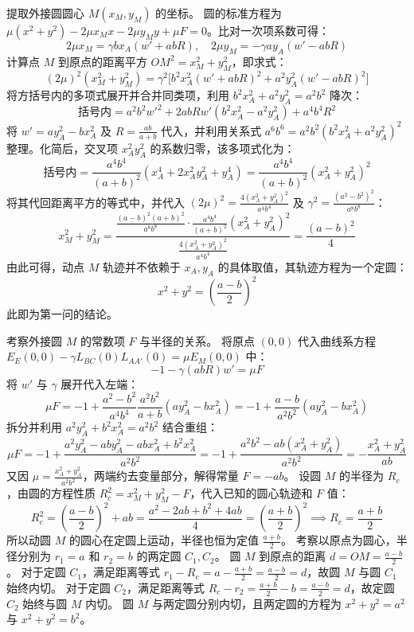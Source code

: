\begin{solution}
提取外接圆圆心 $M(x_M, y_M)$ 的坐标。
圆的标准方程为 $\mu(x^2 + y^2) - 2\mu x_M x - 2\mu y_M y + \mu F = 0$。比对一次项系数可得：
$$ 2\mu x_M = \gamma b x_A (w' + ab R), \quad 2\mu y_M = -\gamma a y_A (w' - ab R) $$
计算点 $M$ 到原点的距离平方 $OM^2 = x_M^2 + y_M^2$，即求式：
$$ (2\mu)^2 (x_M^2 + y_M^2) = \gamma^2 \big[ b^2 x_A^2 (w' + ab R)^2 + a^2 y_A^2 (w' - ab R)^2 \big] $$
将方括号内的多项式展开并合并同类项，利用 $b^2 x_A^2 + a^2 y_A^2 = a^2 b^2$ 降次：
$$ \text{括号内} = a^2 b^2 w'^2 + 2 ab R w' (b^2 x_A^2 - a^2 y_A^2) + a^4 b^4 R^2 $$
将 $w' = a y_A^2 - b x_A^2$ 及 $R = \frac{ab}{a+b}$ 代入，并利用关系式 $a^6 b^6 = a^2 b^2 (b^2 x_A^2 + a^2 y_A^2)^2$ 整理。化简后，交叉项 $x_A^2 y_A^2$ 的系数归零，该多项式化为：
$$ \text{括号内} = \frac{a^4 b^4}{(a+b)^2} (x_A^4 + 2x_A^2 y_A^2 + y_A^4) = \frac{a^4 b^4}{(a+b)^2} (x_A^2 + y_A^2)^2 $$
将其代回距离平方的等式中，并代入 $(2\mu)^2 = \frac{4(x_A^2 + y_A^2)^2}{a^4 b^4}$ 及 $\gamma^2 = \frac{(a^2-b^2)^2}{a^8 b^8}$：
$$ x_M^2 + y_M^2 = \frac{ \frac{(a-b)^2 (a+b)^2}{a^8 b^8} \cdot \frac{a^4 b^4}{(a+b)^2} (x_A^2 + y_A^2)^2 }{ \frac{4(x_A^2 + y_A^2)^2}{a^4 b^4} } = \frac{(a-b)^2}{4} $$
由此可得，动点 $M$ 轨迹并不依赖于 $x_A, y_A$ 的具体取值，其轨迹方程为一个定圆：
$$ x^2 + y^2 = \left( \frac{a-b}{2} \right)^2 $$
此即为第一问的结论。

考察外接圆 $M$ 的常数项 $F$ 与半径的关系。
将原点 $(0,0)$ 代入曲线系方程 $E_E(0,0) - \gamma L_{BC}(0) L_{AA'}(0) = \mu E_M(0,0)$ 中：
$$ -1 - \gamma (ab R) w' = \mu F $$
将 $w'$ 与 $\gamma$ 展开代入左端：
$$ \mu F = -1 + \frac{a^2-b^2}{a^4 b^4} \frac{a^2 b^2}{a+b} (a y_A^2 - b x_A^2) = -1 + \frac{a-b}{a^2 b^2} (a y_A^2 - b x_A^2) $$
拆分并利用 $a^2 y_A^2 + b^2 x_A^2 = a^2 b^2$ 结合重组：
$$ \mu F = -1 + \frac{a^2 y_A^2 - ab y_A^2 - ab x_A^2 + b^2 x_A^2}{a^2 b^2} = -1 + \frac{a^2 b^2 - ab(x_A^2 + y_A^2)}{a^2 b^2} = - \frac{x_A^2 + y_A^2}{ab} $$
又因 $\mu = \frac{x_A^2 + y_A^2}{a^2 b^2}$，两端约去变量部分，解得常量 $F = -ab$。
设圆 $M$ 的半径为 $R_c$，由圆的方程性质 $R_c^2 = x_M^2 + y_M^2 - F$，代入已知的圆心轨迹和 $F$ 值：
$$ R_c^2 = \left( \frac{a-b}{2} \right)^2 + ab = \frac{a^2 - 2ab + b^2 + 4ab}{4} = \left( \frac{a+b}{2} \right)^2 \implies R_c = \frac{a+b}{2} $$
所以动圆 $M$ 的圆心在定圆上运动，半径也恒为定值 $\frac{a+b}{2}$。
考察以原点为圆心，半径分别为 $r_1 = a$ 和 $r_2 = b$ 的两定圆 $C_1, C_2$。
圆 $M$ 到原点的距离 $d = OM = \frac{a-b}{2}$。
对于定圆 $C_1$，满足距离等式 $r_1 - R_c = a - \frac{a+b}{2} = \frac{a-b}{2} = d$，故圆 $M$ 与圆 $C_1$ 始终内切。
对于定圆 $C_2$，满足距离等式 $R_c - r_2 = \frac{a+b}{2} - b = \frac{a-b}{2} = d$，故定圆 $C_2$ 始终与圆 $M$ 内切。
圆 $M$ 与两定圆分别内切，且两定圆的方程为 $x^2 + y^2 = a^2$ 与 $x^2 + y^2 = b^2$。
\end{solution}

